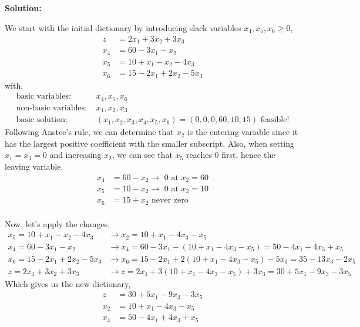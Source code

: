 \documentclass[11pt]{article}
\newenvironment{solution}
  {\par\noindent\textbf{Solution:}\par}
  {\par}
\begin{document}
\subsection{}
\begin{solution}
  We start with the initial dictionary by introducing slack variables $x_4,x_5,x_6 \ge 0$,
  \[
    \begin{aligned}
      z &= 2x_1+3x_2+3x_3 \\
      x_4 &= 60 -3x_1 -x_2 \\ 
      x_5 &= 10 +x_1 - x_2 -4x_3 \\ 
      x_6 &= 15 - 2x_1 + 2x_2 - 5x_3
    \end{aligned}
  \]
  with,
\[
  \begin{aligned}
    \text{basic variables: } &x_4,x_5,x_6 \\ 
    \text{non-basic variables: } &x_1,x_2,x_3 \\ 
    \text{basic solution: } &(x_1,x_2,x_3,x_4,x_5,x_6) = (0,0,0,60,10,15) \text{ feasible!}
  \end{aligned}
\]
Following Anstee's rule, we can determine that $x_2$ is the entering variable since it has the largest positive coefficient with the smaller subscript.
Also, when setting $x_1=x_3=0$ and increasing $x_2$, we can see that $x_5$ reaches 0 first, hence the leaving variable. 
\[
  \begin{aligned}
    x_4 &= 60 -x_2 \to \text{ 0 at }x_2 = 60\\ 
    x_5 &= 10 -x_2 \to \text{ 0 at }x_2 = 10 \\ 
    x_6 &= 15 + x_2 \text{ never zero} 
  \end{aligned}
\]
\\
Now, let's apply the changes,
\[
  \begin{aligned}
    x_5 = 10 + x_1 -x_2 - 4x_3 &\to x_2= 10 + x_1 -4x_3 - x_5 \\ 
    x_4 = 60-3x_1-x_2 &\to x_4 = 60-3x_1 - (10+x_1-4x_3-x_5) = 50 -4x_1 + 4x_3 +x_5 \\ 
    x_6 = 15-2x_1+2x_2-5x_3 &\to x_6 =  15-2x_1 +2(10+x_1-4x_3-x_5) -5x_3 = 35 -13x_3 -2x_5 \\ 
    z = 2x_1+3x_2+3x_3 &\to z = 2x_1 +3(10+x_1-4x_3-x_5) +3x_3 = 30 + 5x_1 -9x_3 -3x_5 
  \end{aligned}
\]
Which gives us the new dictionary,
\[
  \begin{aligned}
    z &= 30+5x_1-9x_3-3x_5 \\ 
    x_2 &= 10+x_1-4x_3-x_5 \\ 
    x_4 &= 50-4x_1+4x_3 + x_5 \\ 

\end{aligned}\]
\end{solution}
\end{document}
